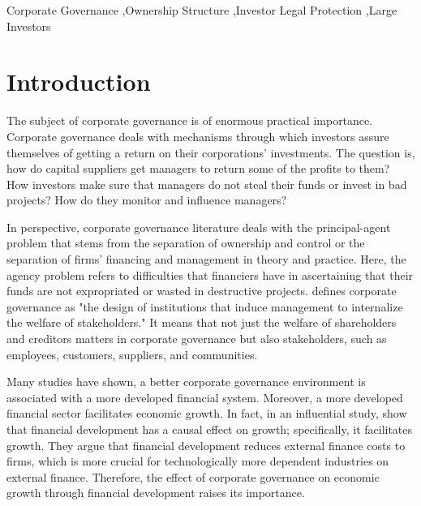 \documentclass[final,1p,authoryear]{elsarticle}
\begin{document}
\begin{frontmatter}
\begin{abstract}
\end{abstract}



\begin{keyword}
Corporate Governance \sep Ownership Structure \sep Investor Legal Protection \sep Large Investors
\end{keyword}



\end{frontmatter}



\section{Introduction}

The subject of corporate governance is of enormous practical importance. Corporate governance deals with mechanisms through which investors assure themselves of getting a return on their corporations' investments. The question is, how do capital suppliers get managers to return some of the profits to them? How investors make sure that managers do not steal their funds or invest in bad projects? How do they monitor and influence managers?

In perspective, corporate governance literature deals with the principal-agent problem that stems from the separation of ownership and control or the separation of firms' financing and management in theory and practice. Here, the agency problem refers to difficulties that financiers have in ascertaining that their funds are not expropriated or wasted in destructive projects. \citet[P.4]{doi:10.1111/1468-0262.00177} defines corporate governance as "the design of institutions that induce management to internalize the welfare of stakeholders." It means that not just the welfare of shareholders and creditors matters in corporate governance but also stakeholders, such as employees, customers, suppliers, and communities.

Many studies have shown, a better corporate governance environment is associated with a more developed financial system. Moreover, a more developed financial sector facilitates economic growth. In fact, in an influential study, \cite{10.2307/116849} show that financial development has a causal effect on growth; specifically, it facilitates growth. They argue that financial development reduces external finance costs to firms, which is more crucial for technologically more dependent industries on external finance. Therefore, the effect of corporate governance on economic growth through financial development raises its importance. 
\end{document}
